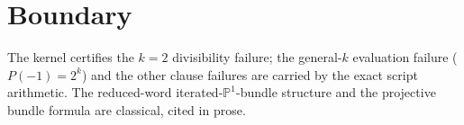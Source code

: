 \documentclass[11pt]{article}
\begin{document}
\section{Boundary}

The kernel certifies the $k = 2$ divisibility failure; the general-$k$
evaluation failure ($P(-1) = 2^k$) and the other clause failures are
carried by the exact script arithmetic. The reduced-word
iterated-$\mathbb{P}^1$-bundle structure and the projective bundle
formula are classical, cited in prose.
\end{document}
